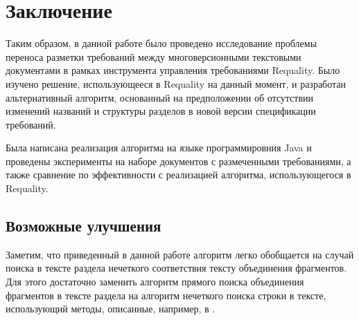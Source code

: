 \section{Заключение}
\label{sec:Chapter6} 

Таким образом, в данной работе было проведено исследование проблемы переноса разметки требований между многоверсионными текстовыми документами в рамках инструмента управления требованиями Requality. Было изучено решение, использующееся в Requality на данный момент, и разработан альтернативный алгоритм, основанный на предположении об отсутствии изменений названий и структуры разделов в новой версии спецификации требований.

Была написана реализация алгоритма на языке программировния Java и проведены эксперименты на наборе документов с размеченными требованиями, а также сравнение по эффективности с реализацией алгоритма, использующегося в Requality.

\subsection{Возможные улучшения}

Заметим, что приведенный в данной работе алгоритм легко обобщается на случай поиска в тексте раздела нечеткого соответствия тексту объединения фрагментов. Для этого достаточно заменить алгоритм прямого поиска объединения фрагментов в тексте раздела на алгоритм нечеткого поиска строки в тексте, использующий методы, описанные, например, в \cite{web:StrNotExact}.